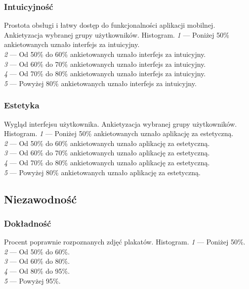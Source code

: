 \documentclass[10pt]{dokument-ppi}
\begin{document}
\subsubsection{Intuicyjność}
\begin{requirement}
    \desc%
        Prostota obsługi i łatwy dostęp do funkcjonalności aplikacji mobilnej.
    \metric%
        Ankietyzacja wybranej grupy użytkowników.
    \tool%
        Histogram.
    \scale%
        \emph{1} --- Poniżej 50\% ankietowanych uznało interfejs za intuicyjny.\\
        \emph{2} --- Od 50\% do 60\% ankietowanych uznało interfejs za intuicyjny.\\
        \emph{3} --- Od 60\% do 70\% ankietowanych uznało interfejs za intuicyjny.\\
        \emph{4} --- Od 70\% do 80\% ankietowanych uznało interfejs za intuicyjny.\\
        \emph{5} --- Powyżej 80\% ankietowanych uznało interfejs za intuicyjny.
\end{requirement}

\subsubsection{Estetyka}
\begin{requirement}
    \desc%
        Wygląd interfejsu użytkownika.
    \metric%
        Ankietyzacja wybranej grupy użytkowników.
    \tool%
        Histogram.
    \scale%
        \emph{1} --- Poniżej 50\% ankietowanych uznało aplikację za estetyczną.\\
        \emph{2} --- Od 50\% do 60\% ankietowanych uznało aplikację za estetyczną.\\
        \emph{3} --- Od 60\% do 70\% ankietowanych uznało aplikację za estetyczną.\\
        \emph{4} --- Od 70\% do 80\% ankietowanych uznało aplikację za estetyczną.\\
        \emph{5} --- Powyżej 80\% ankietowanych uznało aplikację za estetyczną.
\end{requirement}


\subsection{Niezawodność}

\subsubsection{Dokładność}
\begin{requirement}
    \metric*%
        Procent poprawnie rozpoznanych zdjęć plakatów.
    \tool%
        Histogram.
    \scale%
        \emph{1} --- Poniżej 50\%.\\
        \emph{2} --- Od 50\% do 60\%.\\
        \emph{3} --- Od 60\% do 80\%.\\
        \emph{4} --- Od 80\% do 95\%.\\
        \emph{5} --- Powyżej 95\%.
\end{requirement}
\end{document}
